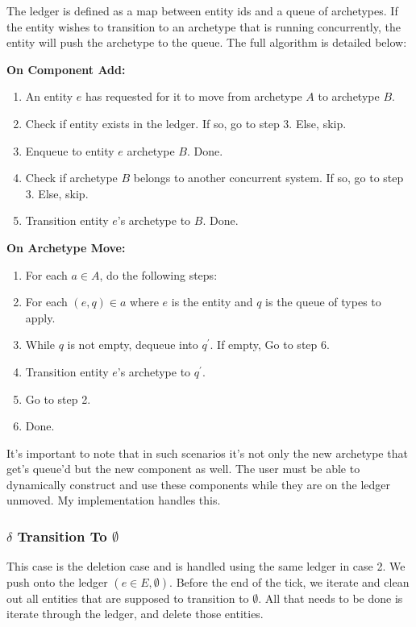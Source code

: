 The ledger is defined as a map between entity ids and a queue of archetypes. If the entity wishes to transition to an archetype that is running concurrently, the entity will push the archetype to the queue. The full algorithm is detailed below:


\textbf{On Component Add:}
\begin{enumerate}
    \item An entity $e$ has requested for it to move from archetype $A$ to archetype $B$.
    \item Check if entity exists in the ledger. If so, go to step 3. Else, skip.
    \item Enqueue to entity $e$ archetype $B$. Done.
    \item Check if archetype $B$ belongs to another concurrent system. If so, go to step 3. Else, skip.
    \item Transition entity $e$'s archetype to $B$. Done.
\end{enumerate}

\textbf{On Archetype Move:}
\begin{enumerate}
    \item For each $a \in A$, do the following steps:
    \item For each $(e, q) \in a$ where $e$ is the entity and $q$ is the queue of types to apply.
    \item While $q$ is not empty, dequeue into $q^\prime$. If empty, Go to step 6.
    \item Transition entity $e$'s archetype to $q^\prime$.
    \item Go to step 2.
    \item Done.
\end{enumerate}

It's important to note that in such scenarios it's not only the new archetype that get's queue'd but the new component as well. The user must be able to dynamically construct and use these components while they are on the ledger unmoved. My implementation handles this.

\subsubsection{$\delta$ Transition To $\emptyset$}
This case is the deletion case and is handled using the same ledger in case 2. We push onto the ledger $(e \in E, \emptyset)$. Before the end of the tick, we iterate and clean out all entities that are supposed to transition to $\emptyset$. All that needs to be done is iterate through the ledger, and delete those entities. 


